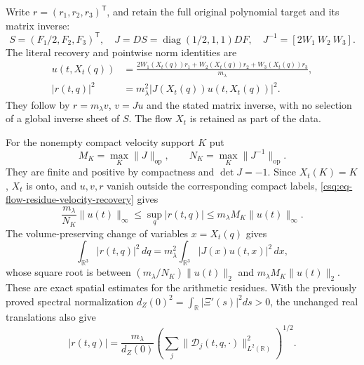 Write $r=(r_1,r_2,r_3)^{\mathsf T}$, and retain the full original
polynomial target and its matrix inverse:
\[
 S=(F_1/2,F_2,F_3)^{\mathsf T},\quad
 J=DS=\operatorname{diag}(1/2,1,1)DF,\quad
 J^{-1}=[2W_1\ W_2\ W_3].
\]
The literal recovery and pointwise norm identities are
\begin{equation}
 \begin{aligned}
 u(t,X_t(q))
 &=\frac{2W_1(X_t(q))r_1+
              W_2(X_t(q))r_2+W_3(X_t(q))r_3}{m_\lambda},\\
 |r(t,q)|^2&=m_\lambda^2|J(X_t(q))u(t,X_t(q))|^2 .
 \end{aligned}
 \label{csq:eq-flow-residue-velocity-recovery}
\end{equation}
They follow by $r=m_\lambda v$, $v=Ju$ and the stated matrix
inverse, with no selection of a global inverse sheet of $S$.
The flow $X_t$ is retained as part of the data.

For the nonempty compact velocity support $K$ put
\[
 M_K=\max_K\|J\|_{\mathrm{op}},\qquad
 N_K=\max_K\|J^{-1}\|_{\mathrm{op}}.
\]
They are finite and positive by compactness and $\det J=-1$.
Since $X_t(K)=K$, $X_t$ is onto, and $u,v,r$ vanish outside
the corresponding compact labels, \eqref{csq:eq-flow-residue-velocity-recovery}
gives
\begin{equation}
 \frac{m_\lambda}{N_K}\|u(t)\|_\infty
 \leq\sup_q|r(t,q)|
 \leq m_\lambda M_K\|u(t)\|_\infty .
 \label{csq:eq-flow-residue-supremum}
\end{equation}
The volume-preserving change of variables $x=X_t(q)$ gives
\begin{equation}
 \int_{\mathbb R^3}|r(t,q)|^2\,dq
 =m_\lambda^2\int_{\mathbb R^3}|J(x)u(t,x)|^2\,dx,
 \label{csq:eq-flow-residue-energy}
\end{equation}
whose square root is between
$(m_\lambda/N_K)\|u(t)\|_2$ and
$m_\lambda M_K\|u(t)\|_2$.
These are exact spatial estimates for the arithmetic residues.
With the previously proved spectral normalization
$d_Z(0)^2=\int_{\mathbb R}|\Xi'(s)|^2ds>0$, the unchanged
real translations also give
\[
 |r(t,q)|
 =\frac{m_\lambda}{d_Z(0)}
       \left(\sum_j\|\mathcal D_j(t,q,\cdot)\|_{L^2(\mathbb R)}^2
       \right)^{1/2}.
\]

